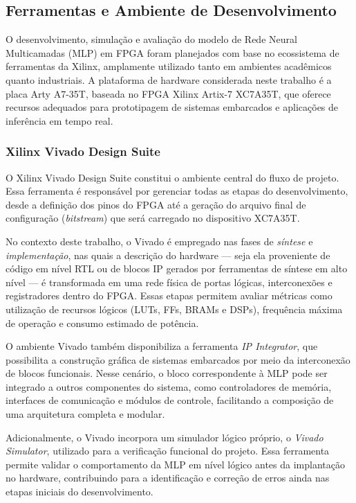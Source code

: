 \subsection{Ferramentas e Ambiente de Desenvolvimento}

O desenvolvimento, simulação e avaliação do modelo de Rede Neural Multicamadas
(MLP) em FPGA foram planejados com base no ecossistema de ferramentas da Xilinx,
amplamente utilizado tanto em ambientes acadêmicos quanto industriais. A
plataforma de hardware considerada neste trabalho é a placa Arty A7-35T,
baseada no FPGA Xilinx Artix-7 XC7A35T, que oferece recursos adequados para
prototipagem de sistemas embarcados e aplicações de inferência em tempo real.

\subsubsection*{Xilinx Vivado Design Suite}

O Xilinx Vivado Design Suite constitui o ambiente central do fluxo de projeto.
Essa ferramenta é responsável por gerenciar todas as etapas do desenvolvimento,
desde a definição dos pinos do FPGA até a geração do arquivo final de configuração
(\textit{bitstream}) que será carregado no dispositivo XC7A35T.

No contexto deste trabalho, o Vivado é empregado nas fases de \textit{síntese} e
\textit{implementação}, nas quais a descrição do hardware — seja ela proveniente
de código em nível RTL ou de blocos IP gerados por ferramentas de síntese em alto
nível — é transformada em uma rede física de portas lógicas, interconexões e
registradores dentro do FPGA. Essas etapas permitem avaliar métricas como
utilização de recursos lógicos (LUTs, FFs, BRAMs e DSPs), frequência máxima de
operação e consumo estimado de potência.

O ambiente Vivado também disponibiliza a ferramenta \textit{IP Integrator}, que
possibilita a construção gráfica de sistemas embarcados por meio da interconexão
de blocos funcionais. Nesse cenário, o bloco correspondente à MLP pode ser
integrado a outros componentes do sistema, como controladores de memória,
interfaces de comunicação e módulos de controle, facilitando a composição de uma
arquitetura completa e modular.

Adicionalmente, o Vivado incorpora um simulador lógico próprio, o
\textit{Vivado Simulator}, utilizado para a verificação funcional do projeto.
Essa ferramenta permite validar o comportamento da MLP em nível lógico antes da
implantação no hardware, contribuindo para a identificação e correção de erros
ainda nas etapas iniciais do desenvolvimento.

